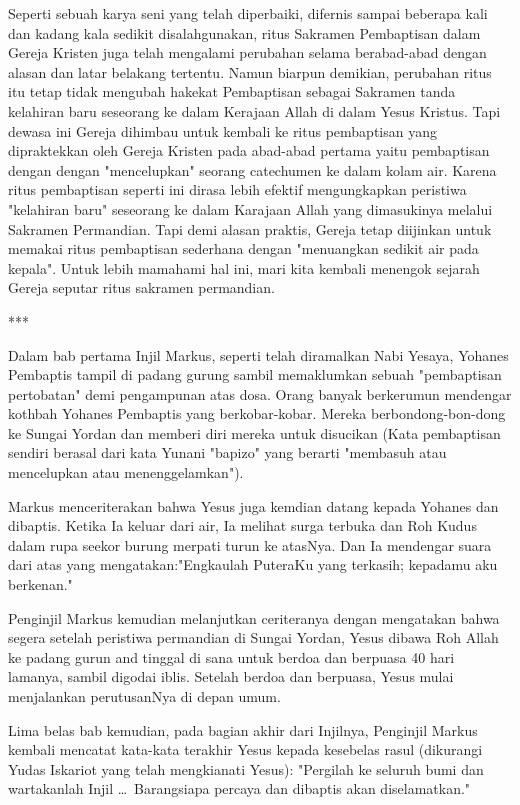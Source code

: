 
    Seperti sebuah karya seni yang telah diperbaiki, difernis sampai beberapa kali dan kadang kala sedikit disalahgunakan, ritus Sakramen Pembaptisan dalam Gereja Kristen juga telah mengalami perubahan selama berabad-abad dengan alasan dan latar belakang tertentu. Namun biarpun demikian, perubahan ritus itu tetap tidak mengubah hakekat Pembaptisan sebagai Sakramen tanda kelahiran baru seseorang ke dalam Kerajaan Allah di dalam Yesus Kristus. Tapi dewasa ini Gereja dihimbau untuk kembali ke ritus pembaptisan yang dipraktekkan oleh Gereja Kristen pada abad-abad pertama yaitu pembaptisan dengan dengan "mencelupkan" seorang catechumen ke dalam kolam air. Karena ritus pembaptisan seperti ini dirasa lebih efektif mengungkapkan peristiwa "kelahiran baru" seseorang ke dalam Karajaan Allah yang dimasukinya melalui Sakramen Permandian. Tapi demi alasan praktis, Gereja tetap diijinkan untuk memakai ritus pembaptisan sederhana dengan "menuangkan sedikit air pada kepala". Untuk lebih mamahami hal ini, mari kita kembali menengok sejarah Gereja seputar ritus sakramen permandian.

    ***

    Dalam bab pertama Injil Markus, seperti telah diramalkan Nabi Yesaya, Yohanes Pembaptis tampil di padang gurung sambil memaklumkan sebuah "pembaptisan pertobatan" demi pengampunan atas dosa. Orang banyak berkerumun mendengar kothbah Yohanes Pembaptis yang berkobar-kobar. Mereka berbondong-bon-dong ke Sungai Yordan dan memberi diri mereka untuk disucikan (Kata pembaptisan sendiri berasal dari kata Yunani "bapizo" yang berarti "membasuh atau mencelupkan atau menenggelamkan").

    Markus menceriterakan bahwa Yesus juga kemdian datang kepada Yohanes dan dibaptis. Ketika Ia keluar dari air, Ia melihat surga terbuka dan Roh Kudus dalam rupa seekor burung merpati turun ke atasNya. Dan Ia mendengar suara dari atas yang mengatakan:"Engkaulah PuteraKu yang terkasih; kepadamu aku berkenan."

    Penginjil Markus kemudian melanjutkan ceriteranya dengan mengatakan bahwa segera setelah peristiwa permandian di Sungai Yordan, Yesus dibawa Roh Allah ke padang gurun and tinggal di sana untuk berdoa dan berpuasa 40 hari lamanya, sambil digodai iblis. Setelah berdoa dan berpuasa, Yesus mulai menjalankan perutusanNya di depan umum.

    Lima belas bab kemudian, pada bagian akhir dari Injilnya, Penginjil Markus kembali mencatat kata-kata terakhir Yesus kepada kesebelas rasul (dikurangi Yudas Iskariot yang telah mengkianati Yesus): "Pergilah ke seluruh bumi dan wartakanlah Injil \dots ~Barangsiapa percaya dan dibaptis akan diselamatkan."

